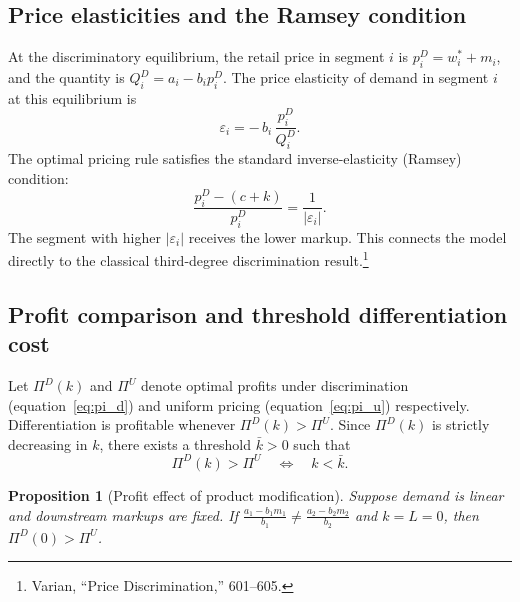 \documentclass[12pt]{article}
\newtheorem{proposition}{Proposition}
\theoremstyle{definition}
\begin{document}
\subsection{Price elasticities and the Ramsey condition}

At the discriminatory equilibrium, the retail price in segment $i$ is $p_i^D = w_i^* + m_i$, and the quantity is $Q_i^D = a_i - b_i p_i^D$.
The price elasticity of demand in segment $i$ at this equilibrium is
\begin{equation}\label{eq:elasticity}
\varepsilon_i = -\,b_i\,\frac{p_i^D}{Q_i^D}.
\end{equation}
The optimal pricing rule satisfies the standard inverse-elasticity (Ramsey) condition:
\begin{equation}\label{eq:ramsey}
\frac{p_i^D - (c+k)}{p_i^D} = \frac{1}{|\varepsilon_i|}.
\end{equation}
The segment with higher $|\varepsilon_i|$ receives the lower markup. This connects the model directly to the classical third-degree discrimination result.\footnote{Varian, ``Price Discrimination,'' 601--605.}

\subsection{Profit comparison and threshold differentiation cost}

Let $\Pi^D(k)$ and $\Pi^U$ denote optimal profits under discrimination (equation~\ref{eq:pi_d}) and uniform pricing (equation~\ref{eq:pi_u}) respectively.
Differentiation is profitable whenever $\Pi^D(k) > \Pi^U$.
Since $\Pi^D(k)$ is strictly decreasing in $k$, there exists a threshold $\bar{k} > 0$ such that
\begin{equation}\label{eq:threshold}
\Pi^D(k) > \Pi^U \quad\Longleftrightarrow\quad k < \bar{k}.
\end{equation}

\begin{proposition}[Profit effect of product modification]\label{prop:profit}
Suppose demand is linear and downstream markups are fixed.
If $\frac{a_1 - b_1 m_1}{b_1} \ne \frac{a_2 - b_2 m_2}{b_2}$ and $k = L = 0$, then $\Pi^D(0) > \Pi^U$.
\end{proposition}
\end{document}
